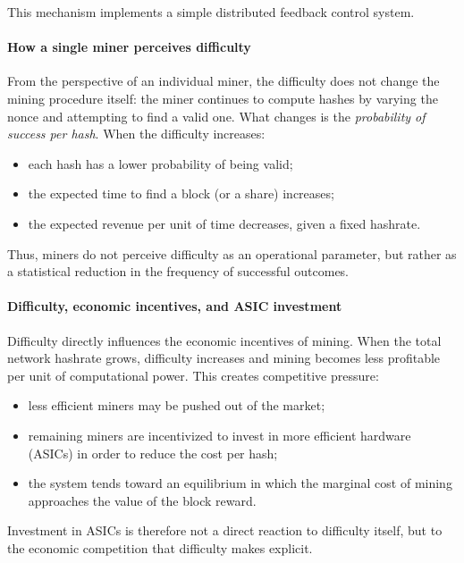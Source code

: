 \documentclass{scrbook}
\begin{document}
This mechanism implements a simple distributed feedback control system.

\paragraph{How a single miner perceives difficulty}

From the perspective of an individual miner, the difficulty does not change the mining procedure itself: the miner continues to compute hashes by varying the nonce and attempting to find a valid one. What changes is the \emph{probability of success per hash}.
When the difficulty increases:

\begin{itemize}
    \item each hash has a lower probability of being valid;
    \item the expected time to find a block (or a share) increases;
    \item the expected revenue per unit of time decreases, given a fixed hashrate.
\end{itemize}

Thus, miners do not perceive difficulty as an operational parameter, but rather as a statistical reduction in the frequency of successful outcomes.

\paragraph{Difficulty, economic incentives, and ASIC investment}

Difficulty directly influences the economic incentives of mining. When the total network hashrate grows, difficulty increases and mining becomes less profitable per unit of computational power.
This creates competitive pressure:

\begin{itemize}
    \item less efficient miners may be pushed out of the market;
    \item remaining miners are incentivized to invest in more efficient hardware (ASICs)
    in order to reduce the cost per hash;
    \item the system tends toward an equilibrium in which the marginal cost of mining
    approaches the value of the block reward.
\end{itemize}

Investment in ASICs is therefore not a direct reaction to difficulty itself, but to the economic competition that difficulty makes explicit.
\end{document}
